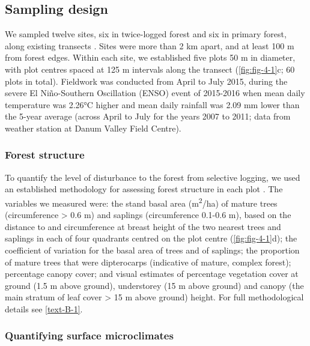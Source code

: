 \documentclass[12pt,a4paper,]{report}
\theoremstyle{definition}
\theoremstyle{definition}
\theoremstyle{definition}
\theoremstyle{remark}
\begin{document}
\subsection{Sampling design}\label{sampling-design}

We sampled twelve sites, six in twice-logged forest and six in primary
forest, along existing transects
\citep[\autoref{fig:fig-4-1}b;][]{edwards_degraded_2011, edwards_selective-logging_2014}.
Sites were more than 2 km apart, and at least 100 m from forest edges.
Within each site, we established five plots 50 m in diameter, with plot
centres spaced at 125 m intervals along the transect
(\autoref{fig:fig-4-1}c; 60 plots in total). Fieldwork was conducted
from April to July 2015, during the severe El Niño-Southern Oscillation
(ENSO) event of 2015-2016 \citep{noaa_2015} when mean daily temperature
was 2.26°C higher and mean daily rainfall was 2.09 mm lower than the
5-year average (across April to July for the years 2007 to 2011; data
from weather station at Danum Valley Field Centre).

\subsubsection*{Forest structure}\label{forest-structure}

To quantify the level of disturbance to the forest from selective
logging, we used an established methodology for assessing forest
structure in each plot \citep{hamer_ecology_2003, lucey_spillover_2012}.
The variables we measured were: the stand basal area
(m\textsuperscript{2}/ha) of mature trees (circumference \textgreater{}
0.6 m) and saplings (circumference 0.1-0.6 m), based on the distance to
and circumference at breast height of the two nearest trees and saplings
in each of four quadrants centred on the plot centre
(\autoref{fig:fig-4-1}d); the coefficient of variation for the basal
area of trees and of saplings; the proportion of mature trees that were
dipterocarps (indicative of mature, complex forest); percentage canopy
cover; and visual estimates of percentage vegetation cover at ground
(1.5 m above ground), understorey (15 m above ground) and canopy (the
main stratum of leaf cover \textgreater{} 15 m above ground) height. For
full methodological details see \autoref{text-B-1}.

\subsubsection*{Quantifying surface
microclimates}\label{quantifying-surface-microclimates}
\end{document}
